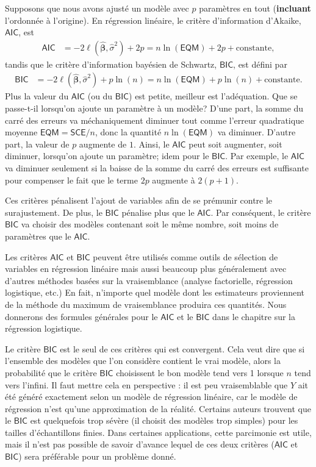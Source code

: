 \documentclass[
  11pt,
  letterpaper,
]{scrbook}
\theoremstyle{definition}
\theoremstyle{remark}
\begin{document}
Supposons que nous avons ajusté un modèle avec \(p\) paramètres en tout
(\textbf{incluant} l'ordonnée à l'origine). En régression linéaire, le
critère d'information d'Akaike, \(\mathsf{AIC}\), est \begin{align*}
\mathsf{AIC} &=-2 \ell(\widehat{\boldsymbol{\beta}}, \widehat{\sigma}^2) +2p = n \ln (\mathsf{EQM}) + 2p + \text{constante},
\end{align*} tandis que le critère d'information bayésien de Schwartz,
\(\mathsf{BIC}\), est défini par \begin{align*}
\mathsf{BIC} &=-2 \ell(\widehat{\boldsymbol{\beta}}, \widehat{\sigma}^2) + p\ln(n)=n \ln (\mathsf{EQM}) + p\ln(n) + \text{constante}.
\end{align*} Plus la valeur du \(\mathsf{AIC}\) (ou du \(\mathsf{BIC}\))
est petite, meilleur est l'adéquation. Que se passe-t-il lorsqu'on
ajoute un paramètre à un modèle? D'une part, la somme du carré des
erreurs va méchaniquement diminuer tout comme l'erreur quadratique
moyenne \(\textsf{EQM} = \textsf{SCE}/n\), donc la quantité
\(n \ln (\mathsf{EQM})\) va diminuer. D'autre part, la valeur de \(p\)
augmente de \(1\). Ainsi, le \(\mathsf{AIC}\) peut soit augmenter, soit
diminuer, lorsqu'on ajoute un paramètre; idem pour le \(\mathsf{BIC}\).
Par exemple, le \(\mathsf{AIC}\) va diminuer seulement si la baisse de
la somme du carré des erreurs est suffisante pour compenser le fait que
le terme \(2p\) augmente à \(2 (p+1)\).

Ces critères pénalisent l'ajout de variables afin de se prémunir contre
le surajustement. De plus, le \(\mathsf{BIC}\) pénalise plus que le
\(\mathsf{AIC}\). Par conséquent, le critère \(\mathsf{BIC}\) va choisir
des modèles contenant soit le même nombre, soit moins de paramètres que
le \(\mathsf{AIC}\).

Les critères \(\mathsf{AIC}\) et \(\mathsf{BIC}\) peuvent être utilisés
comme outils de sélection de variables en régression linéaire mais aussi
beaucoup plus généralement avec d'autres méthodes basées sur la
vraisemblance (analyse factorielle, régression logistique, etc.) En
fait, n'importe quel modèle dont les estimateurs proviennent de la
méthode du maximum de vraisemblance produira ces quantités. Nous
donnerons des formules générales pour le \(\mathsf{AIC}\) et le
\(\mathsf{BIC}\) dans le chapitre sur la régression logistique.

Le critère \(\mathsf{BIC}\) est le seul de ces critères qui est
convergent. Cela veut dire que si l'ensemble des modèles que l'on
considère contient le vrai modèle, alors la probabilité que le critère
\(\mathsf{BIC}\) choisissent le bon modèle tend vers 1 lorsque \(n\)
tend vers l'infini. Il faut mettre cela en perspective : il est peu
vraisemblable que \(Y\) ait été généré exactement selon un modèle de
régression linéaire, car le modèle de régression n'est qu'une
approximation de la réalité. Certains auteurs trouvent que le
\(\mathsf{BIC}\) est quelquefois trop sévère (il choisit des modèles
trop simples) pour les tailles d'échantillons finies. Dans certaines
applications, cette parcimonie est utile, mais il n'est pas possible de
savoir d'avance lequel de ces deux critères (\(\mathsf{AIC}\) et
\(\mathsf{BIC}\)) sera préférable pour un problème donné.
\end{document}
